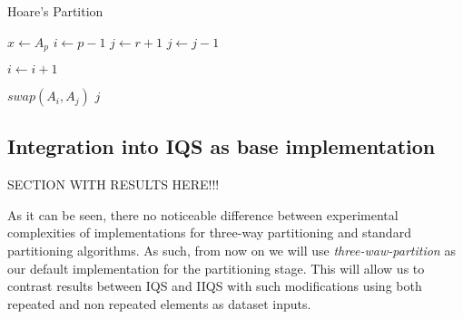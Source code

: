 \begin{algorithm}
\caption{Hoare's Partition}\label{ALG:HOARE_PARTITION}
\begin{algorithmic}[1]
    \State $x \gets A_p$
    \State $i \gets p-1$
    \State $j \gets r+1$
        \Do 
            \State $j \gets j - 1$

        \Do 
            \State $i \gets i + 1$

            \State $swap(A_i, A_j)$
        \Else
            \State \Return $j$
        \EndIf
    \EndWhile
    \EndProcedure
\end{algorithmic}
\end{algorithm}

\subsection{Integration into IQS as base implementation}

SECTION WITH RESULTS HERE!!!

As it can be seen, there no noticeable difference between experimental complexities of implementations for three-way partitioning and standard partitioning algorithms. As such, from now on we will use \textit{three-waw-partition} as our default implementation for the partitioning stage. This will allow us to contrast results between IQS and IIQS with such modifications using both repeated and non repeated elements as dataset inputs.






